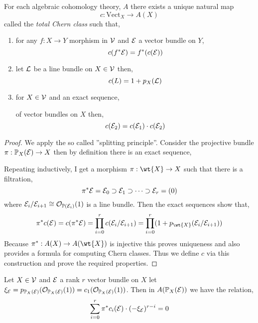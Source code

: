 \documentclass[12pt]{article}
\begin{document}
\begin{thm}
For each algebraic cohomology theory, $A$ there exists a unique natural map \[ c : \mathrm{Vect}_X \to A(X) \]
called the \textit{total Chern class} such that,
\begin{enumerate}
\item for any $f : X \to Y$ morphism in $\mathcal{V}$ and $\mathcal{E}$ a vector bundle on $Y$,
\[ c(f^* \mathcal{E}) = f^*(c(\mathcal{E})) \]
\item let $\mathcal{L}$ be a line bundle on $X \in \mathcal{V}$ then,
\[ c(L) = 1 + p_X(\mathcal{L}) \]
\item for $X \in \mathcal{V}$ and an exact sequence,
\begin{center}
\end{center}
of vector bundles on $X$ then,
\[ c(\mathcal{E}_2) = c(\mathcal{E}_1) \cdot c(\mathcal{E}_2) \]
\end{enumerate}
\end{thm}

\begin{proof}
We apply the so called ''splitting principle''. Consider the projective bundle $\pi : \mathbb{P}_X(\mathcal{E}) \to X$ then by definition there is an exact sequence,
\begin{center}
\end{center}
Repeating inductively, I get a morphism $\pi : \wt{X} \to X$ such that there is a filtration,
\[ \pi^* \mathcal{E} = \mathcal{E}_0 \supset \mathcal{E}_1 \supset \cdots \supset \mathcal{E}_r = (0) \]
where $\mathcal{E}_i / \mathcal{E}_{i+1} \cong \mathcal{O}_{\mathbb{P}(\mathcal{E}_i)}(1)$ is a line bundle. Then the exact sequences show that,
\[ \pi^* c(\E) = c(\pi^* \E) = \prod_{i = 0}^r c(\E_i / \E_{i+1}) = \prod_{i = 0}^r (1 + p_{\wt{X}}(\E_i/\E_{i+1})) \]
Because $\pi^* : A(X) \to A(\wt{X})$ is injective this proves uniqueness and also provides a formula for computing Chern classes. Thus we define $c$ via this construction and prove the required properties.
\end{proof}

\begin{lemma}
Let $X \in \mathcal{V}$ and $\mathcal{E}$ a rank $r$ vector bundle on $X$ let $\xi_{\mathcal{E}} = p_{\mathbb{P}_X(\mathcal{E})}(\mathcal{O}_{\mathbb{P}_X(\mathcal{E})}(1)) = c_1(\mathcal{O}_{\mathbb{P}_X(\mathcal{E})}(1))$. Then in $A(\mathbb{P}_X(\mathcal{E}))$ we have the relation,
\[ \sum_{i = 0}^r \pi^* c_i(\mathcal{E}) \cdot (-\xi_{\mathcal{E}})^{r-i} = 0 \] 
\end{lemma}
\end{document}

